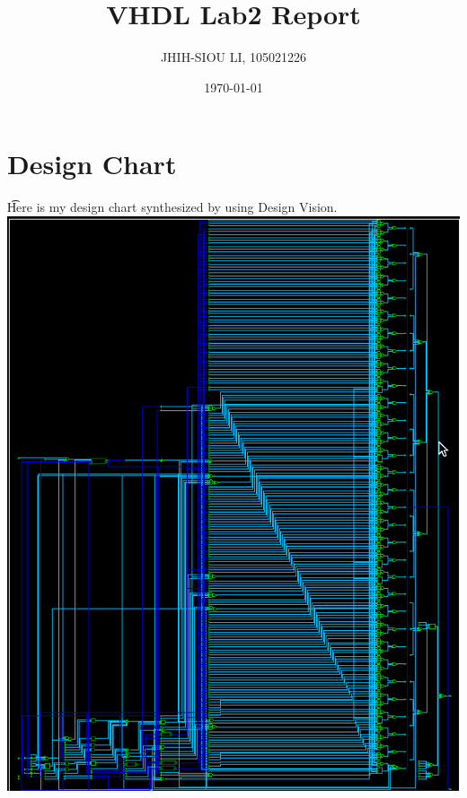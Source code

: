 \documentclass{article}
\title{VHDL Lab2 Report}
\date{\today}
\author{JHIH-SIOU LI, 105021226}
\begin{document}
	\maketitle
	\pagebreak
	\section{Design Chart}
		\t Here is my design chart synthesized by using Design Vision.\\
		\includegraphics{design_chart.png}
\end{document}
